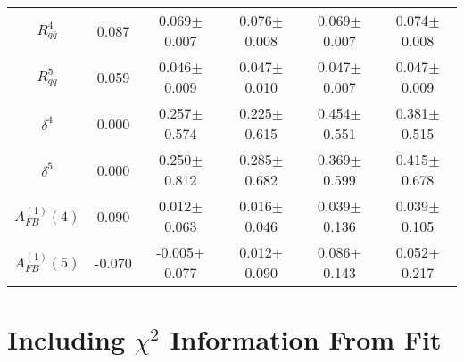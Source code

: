 \documentclass{cmspaperpdf}
\begin{document}
\begin{table}[hbt]
\begin{center}
\begin{tabular}{|c|c|cc|cc|}
$R^4_{q\bar q}$   & 0.087 & 0.069$\pm$0.007  & 0.076$\pm$0.008                               & 0.069$\pm$0.007  & 0.074$\pm$0.008 \\ 
$R^5_{q\bar q}$   & 0.059 & 0.046$\pm$0.009  & 0.047$\pm$0.010                               & 0.047$\pm$0.007  & 0.047$\pm$0.009 \\ 
$\delta^4$        & 0.000 & 0.257$\pm$0.574  & 0.225$\pm$0.615                               & 0.454$\pm$0.551  & 0.381$\pm$0.515 \\ 
$\delta^5$        & 0.000 & 0.250$\pm$0.812  & 0.285$\pm$0.682                               & 0.369$\pm$0.599  & 0.415$\pm$0.678 \\ 
$A^{(1)}_{FB}(4)$ & 0.090 & 0.012$\pm$0.063  & 0.016$\pm$0.046                               & 0.039$\pm$0.136  & 0.039$\pm$0.105 \\
$A^{(1)}_{FB}(5)$ & -0.070 & -0.005$\pm$0.077 & 0.012$\pm$0.090                               & 0.086$\pm$0.143  & 0.052$\pm$0.217 \\
\hline
\end{tabular}
\end{center}
\end{table}

\section{Including $\chi^{2}$ Information From Fit}
\end{document}
